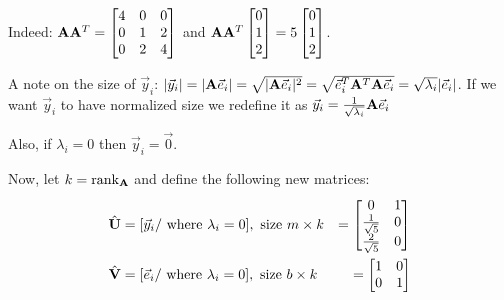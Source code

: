 Indeed: $\mathbf{A} \mathbf{A}^T = \begin{bmatrix}
    4 & 0 & 0 \\
    0 & 1 & 2 \\
    0 & 2 & 4
\end{bmatrix}$ and $\mathbf{A} \mathbf{A}^T  \begin{bmatrix} 0 \\ 1 \\ 2 \\ \end{bmatrix}  = 5  \begin{bmatrix} 0 \\ 1 \\ 2 \\ \end{bmatrix} $.

A note on the size of $\vec{y}_i$: $|\vec{y}_i| = |\mathbf{A} \vec{e}_i| = \sqrt{|\mathbf{A}\vec{e}_i|^2} = \sqrt{\vec{e}_i^T \mathbf{A}^T \mathbf{A} \vec{e}_i} = \sqrt{\lambda_i} |\vec{e}_i|$.
If we want $\vec{y}_i$ to have normalized size we redefine it as $ \vec{y}_i = \frac{1}{\sqrt{\lambda_i}} \mathbf{A} \vec{e}_i $

Also, if $\lambda_i = 0$ then $\vec{y}_i = \vec{0}$.


Now, let $k = \text{rank}_{\mathbf{A}}$ and define the following new matrices:
\begin{equation}
    \begin{aligned}
        \hat{\mathbf{U}} &= [\vec{y}_i / \text{ where } \lambda_i = 0], \text{ size } m \times k  &= \begin{bmatrix}
                                                                                                        0 & 1 \\
                                                                                                        \frac{1}{\sqrt{5}} & 0 \\
                                                                                                        \frac{2}{\sqrt{5}} & 0
                                                                                                    \end{bmatrix}  \\
        \hat{\mathbf{V}} &= [\vec{e}_i / \text{ where } \lambda_i = 0], \text{ size } b \times k &= \begin{bmatrix}
                                                                                                        1 & 0 \\
                                                                                                        0 & 1
                                                                                                    \end{bmatrix}
    \end{aligned}
\end{equation}

